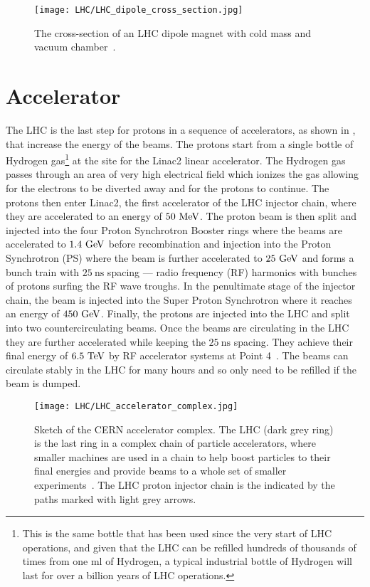 \begin{figure}[htbp]
 \centering
 \texttt{[image: LHC/LHC\_dipole\_cross\_section.jpg]}
 \caption{The cross-section of an LHC dipole magnet with cold mass and vacuum chamber~\cite{LHC:dipole}.}\label{fig:LHC_dipole_cross_section}
\end{figure}

\section{Accelerator}

The LHC is the last step for protons in a sequence of accelerators, as shown in , that increase the energy of the beams.
The protons start from a single bottle of Hydrogen gas\footnote{This is the same bottle that has been used since the very start of LHC operations, and given that the LHC can be refilled hundreds of thousands of times from one $\textrm{ml}$ of Hydrogen, a typical industrial bottle of Hydrogen will last for over a billion years of LHC operations.} at the site for the Linac2 linear accelerator.
The Hydrogen gas passes through an area of very high electrical field which ionizes the gas allowing for the electrons to be diverted away and for the protons to continue.
The protons then enter Linac2, the first accelerator of the LHC injector chain, where they are accelerated to an energy of $50~\mathrm{MeV}$.
The proton beam is then split and injected into the four Proton Synchrotron Booster rings where the beams are accelerated to $1.4~\mathrm{GeV}$ before recombination and injection into the \Gls{Proton Synchrotron} (PS) where the beam is further accelerated to $25~\mathrm{GeV}$ and forms a bunch train with $25~\textrm{ns}$ spacing --- radio frequency (RF) harmonics with bunches of protons surfing the RF wave troughs.
In the penultimate stage of the injector chain, the beam is injected into the Super Proton Synchrotron where it reaches an energy of $450~\mathrm{GeV}$.
Finally, the protons are injected into the LHC and split into two countercirculating beams.
Once the beams are circulating in the LHC they are further accelerated while keeping the $25~\textrm{ns}$ spacing.
They achieve their final energy of $6.5~\mathrm{TeV}$ by RF accelerator systems at Point 4~\cite{Evans:2008,Boussard:410377}.
The beams can circulate stably in the LHC for many hours and so only need to be refilled if the beam is dumped.

\begin{figure}[htbp]
 \centering
 \texttt{[image: LHC/LHC\_accelerator\_complex.jpg]}
 \caption{Sketch of the CERN accelerator complex.
  The LHC (dark grey ring) is the last ring in a complex chain of particle accelerators, where smaller machines are used in a chain to help boost particles to their final energies and provide beams to a whole set of smaller experiments~\cite{Haffner:1621894}.
  The LHC proton injector chain is the indicated by the paths marked with light grey arrows.}\label{fig:LHC_accelerator_complex}
\end{figure}

